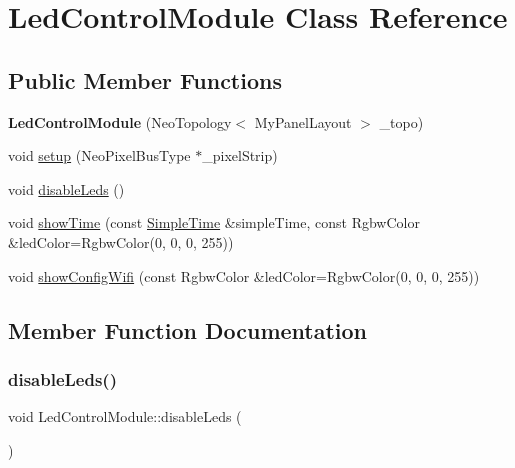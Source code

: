 \hypertarget{class_led_control_module}{}\section{Led\+Control\+Module Class Reference}
\label{class_led_control_module}
\subsection*{Public Member Functions}
\begin{DoxyCompactItemize}
\item 
\mbox{\label{class_led_control_module_a5a653e4a322f618a6937449fafe959bb}} 
{\bfseries Led\+Control\+Module} (Neo\+Topology$<$ My\+Panel\+Layout $>$ \+\_\+topo)
\item 
void \mbox{\hyperlink{class_led_control_module_ae1eb70e65006f55b30f6a034706829b5}{setup}} (Neo\+Pixel\+Bus\+Type $\ast$\+\_\+pixel\+Strip)
\item 
void \mbox{\hyperlink{class_led_control_module_abd6255fc5d3a54b5befd131e56674313}{disable\+Leds}} ()
\item 
void \mbox{\hyperlink{class_led_control_module_a873a4c44c95a7da2ca0665b0e69cf392}{show\+Time}} (const \mbox{\hyperlink{class_simple_time}{Simple\+Time}} \&simple\+Time, const Rgbw\+Color \&led\+Color=Rgbw\+Color(0, 0, 0, 255))
\item 
void \mbox{\hyperlink{class_led_control_module_a70c42e2f9baee807bfdb9fe9bd2f6d8e}{show\+Config\+Wifi}} (const Rgbw\+Color \&led\+Color=Rgbw\+Color(0, 0, 0, 255))
\end{DoxyCompactItemize}


\subsection{Member Function Documentation}
\mbox{\label{class_led_control_module_abd6255fc5d3a54b5befd131e56674313}} 
\subsubsection{\texorpdfstring{disableLeds()}{disableLeds()}}
{\footnotesize\ttfamily void Led\+Control\+Module\+::disable\+Leds (\begin{DoxyParamCaption}{ }\end{DoxyParamCaption})}

